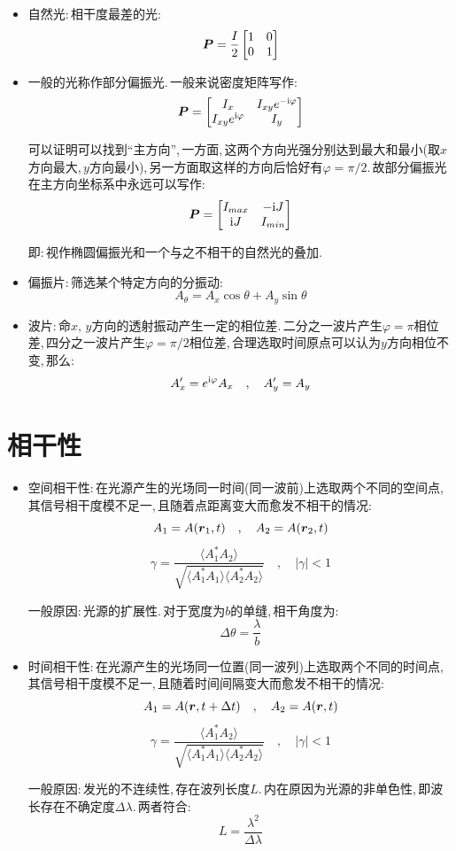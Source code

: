 \begin{itemize}
\item 自然光:\,相干度最差的光:
\[\boldsymbol{P}=\frac{I}{2}\begin{bmatrix}
1 & 0\\
0 & 1
\end{bmatrix}\]

\item 一般的光称作部分偏振光.\,一般来说密度矩阵写作:
\[ \boldsymbol{P}=\begin{bmatrix}
I_x & I_{xy}e^{-{\rm i}\varphi}\\
 I_{xy}e^{{\rm i}\varphi} & I_y
\end{bmatrix}\]

可以证明可以找到``主方向'',\,一方面,\,这两个方向光强分别达到最大和最小(取$x$方向最大,\,$y$方向最小),\,另一方面取这样的方向后恰好有$\varphi=\pi/2$.\,故部分偏振光在主方向坐标系中永远可以写作:
\[\boldsymbol{P}=\begin{bmatrix}
I_{max} & -{\rm i} J\\
{\rm i} J & I_{min}
\end{bmatrix}\]

即:\,视作椭圆偏振光和一个与之不相干的自然光的叠加.

\item 偏振片:\,筛选某个特定方向的分振动:
\[A_\theta=A_x\cos\theta +A_y\sin\theta\]

\item 波片:\,命$x,\,y$方向的透射振动产生一定的相位差.\,二分之一波片产生$\varphi=\pi$相位差,\,四分之一波片产生$\varphi=\pi/2$相位差,\,合理选取时间原点可以认为$y$方向相位不变,\,那么:
\[A_x'=e^{{\rm i} \varphi }A_x \quad ,\quad A_y'=A_y\]

\end{itemize}

\section{相干性}

\begin{itemize}
\item 空间相干性:\,在光源产生的光场同一时间(同一波前)上选取两个不同的空间点,\,其信号相干度模不足一,\,且随着点距离变大而愈发不相干的情况:
\[A_1=A(\boldsymbol{r}_1,t)\quad ,\quad A_2=A(\boldsymbol{r}_2,t)\]
\[\gamma=\frac{\langle A_1^\ast A_2 \rangle}{\sqrt{\langle A_1^\ast A_1\rangle\langle A_2^\ast A_2\rangle}} \quad ,\quad |\gamma|<1\]

一般原因:\,光源的扩展性.\,对于宽度为$b$的单缝,\,相干角度为:
\[\Delta \theta=\frac{\lambda}{b}\]

\item 时间相干性:\,在光源产生的光场同一位置(同一波列)上选取两个不同的时间点,\,其信号相干度模不足一,\,且随着时间间隔变大而愈发不相干的情况:
\[A_1=A(\boldsymbol{r},t+\Delta t)\quad ,\quad A_2=A(\boldsymbol{r},t)\]
\[\gamma=\frac{\langle A_1^\ast A_2 \rangle}{\sqrt{\langle A_1^\ast A_1\rangle\langle A_2^\ast A_2\rangle}} \quad ,\quad |\gamma|<1\]

一般原因:\,发光的不连续性,\,存在波列长度$L$.\,内在原因为光源的非单色性,\,即波长存在不确定度$\Delta \lambda$.\,两者符合:
\[L=\frac{\lambda^2}{\Delta \lambda}\]
\end{itemize}



